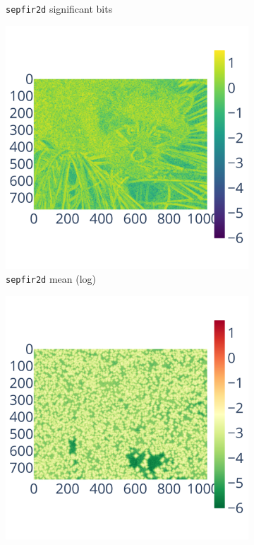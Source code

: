 \documentclass[10pt,journal,compsoc]{IEEEtran}
\begin{document}
\begin{figure}
\begin{subfigure}{0.3\linewidth}
        \caption{\centering\texttt{sepfir2d} significant bits}
        \label{fig:bspline_bisplev_sig}
    \end{subfigure}
    \begin{subfigure}{0.3\linewidth}
        \includegraphics[width=\linewidth]{figure/bspline/bspline_mean_log.pdf}
        \caption{\centering\texttt{sepfir2d} mean (log)}
        \label{fig:bspline_bisplev_mean}
    \end{subfigure}
    \begin{subfigure}{0.3\linewidth}
        \includegraphics[width=\linewidth]{figure/bspline/bspline_std_log.pdf}

\end{subfigure}
\end{figure}
\end{document}

